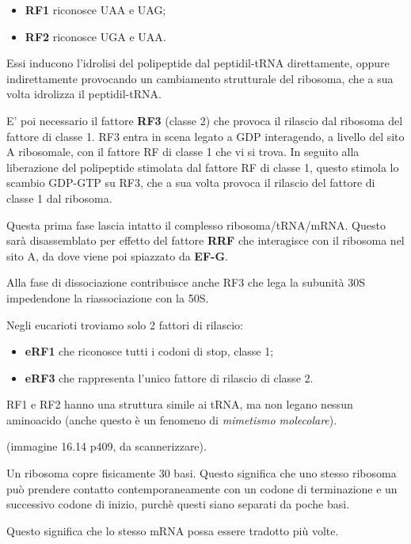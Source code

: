 \documentclass[]{article}
\begin{document}
\begin{itemize}
\itemsep1pt\parskip0pt
\item
  \textbf{RF1} riconosce UAA e UAG;
\item
  \textbf{RF2} riconosce UGA e UAA.
\end{itemize}

Essi inducono l'idrolisi del polipeptide dal peptidil-tRNA direttamente,
oppure indirettamente provocando un cambiamento strutturale del
ribosoma, che a sua volta idrolizza il peptidil-tRNA.

E' poi necessario il fattore \textbf{RF3} (classe 2) che provoca il
rilascio dal ribosoma del fattore di classe 1. RF3 entra in scena legato
a GDP interagendo, a livello del sito A ribosomale, con il fattore RF di
classe 1 che vi si trova. In seguito alla liberazione del polipeptide
stimolata dal fattore RF di classe 1, questo stimola lo scambio GDP-GTP
su RF3, che a sua volta provoca il rilascio del fattore di classe 1 dal
ribosoma.

Questa prima fase lascia intatto il complesso ribosoma/tRNA/mRNA. Questo
sarà disassemblato per effetto del fattore \textbf{RRF} che interagisce
con il ribosoma nel sito A, da dove viene poi spiazzato da
\textbf{EF-G}.

Alla fase di dissociazione contribuisce anche RF3 che lega la subunità
30S impedendone la riassociazione con la 50S.

Negli eucarioti troviamo solo 2 fattori di rilascio:

\begin{itemize}
\itemsep1pt\parskip0pt
\item
  \textbf{eRF1} che riconosce tutti i codoni di stop, classe 1;
\item
  \textbf{eRF3} che rappresenta l'unico fattore di rilascio di classe 2.
\end{itemize}

RF1 e RF2 hanno una struttura simile ai tRNA, ma non legano nessun
aminoacido (anche questo è un fenomeno di \emph{mimetismo molecolare}).

(immagine 16.14 p409, da scannerizzare).

Un ribosoma copre fisicamente 30 basi. Questo significa che uno stesso
ribosoma può prendere contatto contemporaneamente con un codone di
terminazione e un successivo codone di inizio, purchè questi siano
separati da poche basi.

Questo significa che lo stesso mRNA possa essere tradotto più volte.
\end{document}
